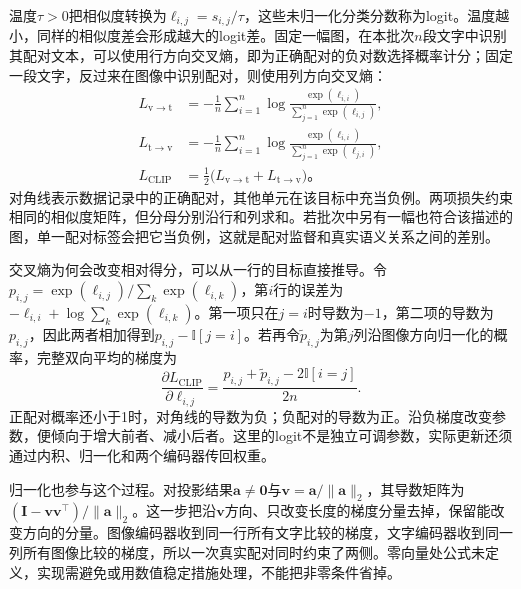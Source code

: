 温度$\tau>0$把相似度转换为$\ell_{i,j}=s_{i,j}/\tau$，这些未归一化分类分数称为logit。温度越小，同样的相似度差会形成越大的logit差。固定一幅图，在本批次$n$段文字中识别其配对文本，可以使用行方向交叉熵，即为正确配对的负对数选择概率计分；固定一段文字，反过来在图像中识别配对，则使用列方向交叉熵：
\begin{equation}
  \begin{aligned}
    L_{\mathrm{v\to t}}
      &=-\frac1n\sum_{i=1}^n
        \log\frac{\exp(\ell_{i,i})}{\sum_{j=1}^n\exp(\ell_{i,j})},\\
    L_{\mathrm{t\to v}}
      &=-\frac1n\sum_{i=1}^n
        \log\frac{\exp(\ell_{i,i})}{\sum_{j=1}^n\exp(\ell_{j,i})},\\
    L_{\mathrm{CLIP}}&=\tfrac12
        \bigl(L_{\mathrm{v\to t}}+L_{\mathrm{t\to v}}\bigr)\text{。}
  \end{aligned}
  \label{eq:vision-clip-loss}
\end{equation}
对角线表示数据记录中的正确配对，其他单元在该目标中充当负例。两项损失约束相同的相似度矩阵，但分母分别沿行和列求和。若批次中另有一幅也符合该描述的图，单一配对标签会把它当负例，这就是配对监督和真实语义关系之间的差别。

交叉熵为何会改变相对得分，可以从一行的目标直接推导。令$p_{i,j}=\exp(\ell_{i,j})/\sum_k\exp(\ell_{i,k})$，第$i$行的误差为$-\ell_{i,i}+\log\sum_k\exp(\ell_{i,k})$。第一项只在$j=i$时导数为$-1$，第二项的导数为$p_{i,j}$，因此两者相加得到$p_{i,j}-\mathbb I[j=i]$。若再令$\widetilde p_{i,j}$为第$j$列沿图像方向归一化的概率，完整双向平均的梯度为
\begin{equation}
  \frac{\partial L_{\mathrm{CLIP}}}{\partial\ell_{i,j}}
   =\frac{p_{i,j}+\widetilde p_{i,j}
                 -2\mathbb I[i=j]}{2n}.
  \label{eq:vision-clip-logit-gradient}
\end{equation}
正配对概率还小于1时，对角线的导数为负；负配对的导数为正。沿负梯度改变参数，便倾向于增大前者、减小后者。这里的logit不是独立可调参数，实际更新还须通过内积、归一化和两个编码器传回权重。

归一化也参与这个过程。对投影结果$\bm a\ne\bm0$与$\bm v=\bm a/\lVert\bm a\rVert_2$，其导数矩阵为$(\bm I-\bm v\bm v^\top)/\lVert\bm a\rVert_2$。这一步把沿$\bm v$方向、只改变长度的梯度分量去掉，保留能改变方向的分量。图像编码器收到同一行所有文字比较的梯度，文字编码器收到同一列所有图像比较的梯度，所以一次真实配对同时约束了两侧。零向量处公式未定义，实现需避免或用数值稳定措施处理，不能把非零条件省掉。

